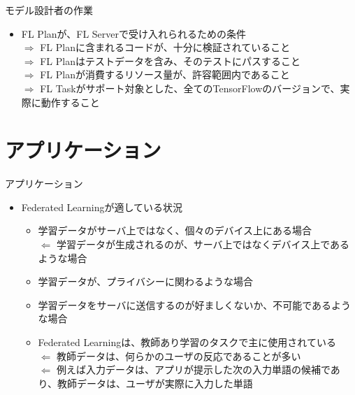 \documentclass[dvipdfmx,notheorems,t]{beamer}
\begin{document}
\begin{frame}{モデル設計者の作業}
\begin{enumerate}
\begin{itemize}
		\item FL Planが、FL Serverで受け入れられるための条件 \\
		$\Rightarrow$ FL Planに含まれるコードが、十分に検証されていること \\
		$\Rightarrow$ FL Planはテストデータを含み、そのテストにパスすること \\
		$\Rightarrow$ FL Planが消費するリソース量が、許容範囲内であること \\
		$\Rightarrow$ FL Taskがサポート対象とした、全てのTensorFlowのバージョンで、実際に動作すること
	\end{itemize}
\end{enumerate}

\end{frame}

\section{アプリケーション}

\begin{frame}{アプリケーション}

\begin{itemize}
	\item Federated Learningが適している状況
	\begin{itemize}
		\item 学習データがサーバ上ではなく、個々のデバイス上にある場合 \\
		$\Leftarrow$ 学習データが生成されるのが、サーバ上ではなくデバイス上であるような場合
		\newline
		
		\item 学習データが、プライバシーに関わるような場合
		\item 学習データをサーバに送信するのが好ましくないか、不可能であるような場合
		\newline
		
		\item Federated Learningは、教師あり学習のタスクで主に使用されている \\
		$\Leftarrow$ 教師データは、何らかのユーザの反応であることが多い \\
		$\Leftarrow$ 例えば入力データは、アプリが提示した次の入力単語の候補であり、教師データは、ユーザが実際に入力した単語
	\end{itemize}
\end{itemize}

\end{frame}
\end{document}
